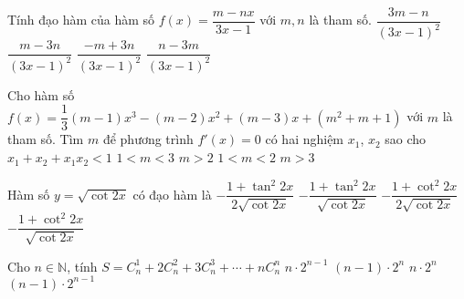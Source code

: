 \begin{ex}%
	Tính đạo hàm của hàm số $f(x)=\dfrac{m-nx}{3x-1}$ với $m, n$ là tham số.
	\choice
	{$\dfrac{3m-n}{(3x-1)^2}$}
	{$\dfrac{m-3n}{(3x-1)^2}$}
	{$\dfrac{-m+3n}{(3x-1)^2}$}
	{\True	$\dfrac{n-3m}{(3x-1)^2}$}
\end{ex}

\begin{ex}%
	Cho hàm số $f(x)=\dfrac{1}{3}(m-1)x^3-(m-2)x^2+(m-3)x+(m^2+m+1)$ với $m$ là tham số. Tìm $m$ để phương trình $f'(x)=0$ có hai nghiệm $x_1$, $x_2$ sao cho $x_1+x_2+x_1x_2<1$
	\choice
	{\True $1<m<3$}
	{$m>2$}
	{$1<m<2$}
	{$m>3$}
\end{ex}

\begin{ex}%
	Hàm số $y=\sqrt{\cot 2x}$ có đạo hàm là
	\choice
	{$-\dfrac{1+\tan^2 2x}{2\sqrt{\cot 2x}}$}
	{$-\dfrac{1+\tan^2 2x}{\sqrt{\cot 2x}}$}
	{$-\dfrac{1+\cot^2 2x}{2\sqrt{\cot 2x}}$}
	{\True$-\dfrac{1+\cot^2 2x}{\sqrt{\cot 2x}}$}
\end{ex}

\begin{ex}%
	Cho $n \in \mathbb{N}$, tính $S=C^1_n+2C^2_n+3C^3_n+\cdots + nC_n^n$
	\choice
	{\True $n\cdot2^{n-1}$}
	{$(n-1)\cdot2^{n}$}
	{$n\cdot2^{n}$}
	{$(n-1)\cdot2^{n-1}$}
\end{ex}

